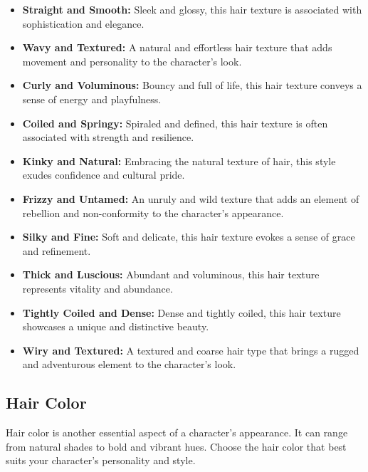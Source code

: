 \begin{itemize}
    \item \textbf{Straight and Smooth:} Sleek and glossy, this hair texture is associated with sophistication and elegance.
    \item \textbf{Wavy and Textured:} A natural and effortless hair texture that adds movement and personality to the character's look.
    \item \textbf{Curly and Voluminous:} Bouncy and full of life, this hair texture conveys a sense of energy and playfulness.
    \item \textbf{Coiled and Springy:} Spiraled and defined, this hair texture is often associated with strength and resilience.
    \item \textbf{Kinky and Natural:} Embracing the natural texture of hair, this style exudes confidence and cultural pride.
    \item \textbf{Frizzy and Untamed:} An unruly and wild texture that adds an element of rebellion and non-conformity to the character's appearance.
    \item \textbf{Silky and Fine:} Soft and delicate, this hair texture evokes a sense of grace and refinement.
    \item \textbf{Thick and Luscious:} Abundant and voluminous, this hair texture represents vitality and abundance.
    \item \textbf{Tightly Coiled and Dense:} Dense and tightly coiled, this hair texture showcases a unique and distinctive beauty.
    \item \textbf{Wiry and Textured:} A textured and coarse hair type that brings a rugged and adventurous element to the character's look.
\end{itemize}

\subsection{\textbf{Hair Color}}

Hair color is another essential aspect of a character's appearance. It can range from natural shades to bold and vibrant hues. Choose the hair color that best suits your character's personality and style.

